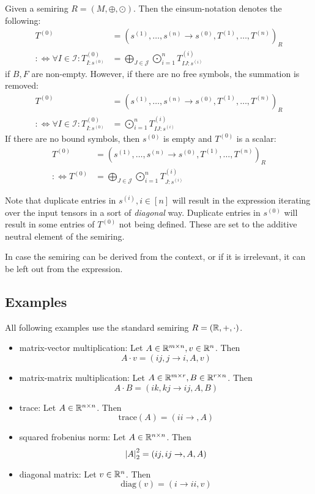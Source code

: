 \begin{definition}
    Given a semiring $R = (M, \oplus, \odot)$. Then the einsum-notation denotes the following:
    \begin{align*}
        T^{(0)}                                               & = (s^{(1)},\dots,s^{(n)} \rightarrow s^{(0)}, T^{(1)},\dots,T^{(n)})_R                  \\
        :\iff \forall I \in \mathcal{I}: T^{(0)}_{I: s^{(0)}} & = \bigoplus\limits_{J \in \mathcal{J}} \bigodot\limits_{i = 1}^{n} T^{(i)}_{IJ:s^{(i)}}
    \end{align*}
    if $B,F$ are non-empty. However, if there are no free symbols, the summation is removed:
    \begin{align*}
        T^{(0)}                                               & = (s^{(1)},\dots,s^{(n)} \rightarrow s^{(0)}, T^{(1)},\dots,T^{(n)})_R \\
        :\iff \forall I \in \mathcal{I}: T^{(0)}_{I: s^{(0)}} & = \bigodot\limits_{i = 1}^{n} T^{(i)}_{IJ:s^{(i)}}
    \end{align*}
    If there are no bound symbols, then $s^{(0)}$ is empty and $T^{(0)}$ is a scalar:
    \begin{align*}
        T^{(0)}       & = (s^{(1)},\dots,s^{(n)} \rightarrow s^{(0)}, T^{(1)},\dots,T^{(n)})_R                 \\
        :\iff T^{(0)} & = \bigoplus\limits_{J \in \mathcal{J}} \bigodot\limits_{i = 1}^{n} T^{(i)}_{J:s^{(i)}}
    \end{align*}

    Note that duplicate entries in $s^{(i)}, i \in [n]$ will result in the expression iterating over the input tensors in a sort of \textit{diagonal} way.
    Duplicate entries in $s^{(0)}$ will result in some entries of $T^{(0)}$ not being defined. These are set to the additive neutral element of the semiring.

    In case the semiring can be derived from the context, or if it is irrelevant, it can be left out from the expression.
\end{definition}

\subsection{Examples}
All following examples use the standard semiring $R = (\mathbb{R}, +, \cdot)$.
\begin{itemize}
    \item matrix-vector multiplication: Let $A \in \mathbb{R}^{m \times n}, v \in \mathbb{R}^{n}$. Then
          $$A \cdot v = (ij, j \rightarrow i, A, v)$$
    \item matrix-matrix multiplication: Let $A \in \mathbb{R}^{m \times r}, B \in \mathbb{R}^{r \times n}$. Then
          $$A \cdot B = (ik, kj \rightarrow ij, A, B)$$
    \item trace: Let $A \in \mathbb{R}^{n \times n}$. Then
          $$\text{trace}(A) = (ii \rightarrow, A)$$
    \item squared frobenius norm: Let $A \in \mathbb{R}^{n \times n}$. Then
          $$\left| A \right|_2^2 = (ij, ij \rightarrow,A,A)$$
    \item diagonal matrix: Let $v \in \mathbb{R}^{n}$. Then
          $$\text{diag}(v) = (i \rightarrow ii, v)$$
\end{itemize}

